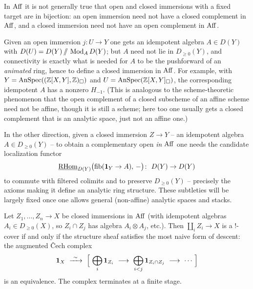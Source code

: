 \begin{remark}
\label{rmk:18:open-vs-closed}
In $\operatorname{Aff}$ it is not generally true that open and closed immersions with a fixed
target are in bijection: an open immersion need not have a closed complement in
$\operatorname{Aff}$, and a closed immersion need not have an open complement in $\operatorname{Aff}$.

Given an open immersion $j\colon U\to Y$ one gets an idempotent algebra $A\in D(Y)$
with $D(U)=D(Y)\,/\!\!/\,\operatorname{Mod}_A D(Y)$; but $A$ need not lie in $D_{\ge0}(Y)$, and
connectivity is exactly what is needed for $A$ to be the pushforward of an
\emph{animated} ring, hence to define a closed immersion in $\operatorname{Aff}$. For example,
with $Y=\operatorname{AnSpec}((\mathbb{Z}[X,Y],\mathbb{Z})_\square)$ and
$U=\operatorname{AnSpec}(\mathbb{Z}[X,Y]_\square)$, the corresponding idempotent $A$ has a nonzero
$H_{-1}$. (This is analogous to the scheme-theoretic phenomenon that the open
complement of a closed subscheme of an affine scheme need not be affine, though it
is still a scheme; here too one usually gets a closed complement that is an
analytic space, just not an affine one.)

In the other direction, given a closed immersion $Z\to Y$ -- an idempotent algebra
$A\in D_{\ge0}(Y)$ -- to obtain a complementary open \emph{in $\operatorname{Aff}$} one needs the
candidate localization functor
\begin{equation*}
\underline{\mathrm{RHom}}_{D(Y)}\bigl(\operatorname{fib}(\mathbf 1_Y\to A),\,-\bigr)\colon\ D(Y)\to D(Y)
\end{equation*}
to commute with filtered colimits and to preserve $D_{\ge0}(Y)$ -- precisely the
axioms making it define an analytic ring structure. These subtleties will be
largely fixed once one allows general (non-affine) analytic spaces and stacks.
\end{remark}

\begin{proposition}
\label{prop:18:closed-cover}
Let $Z_1,\dots,Z_n\to X$ be closed immersions in $\operatorname{Aff}$ (with idempotent algebras
$A_i\in D_{\ge0}(X)$, so $Z_i\cap Z_j$ has algebra $A_i\otimes A_j$, etc.). Then
$\coprod_{i} Z_i\to X$ is a $!$-cover if and only if the structure sheaf satisfies
the most naive form of descent: the augmented \v Cech complex
\begin{equation}
\label{eq:18:closed-cech}
\mathbf 1_X\ \xrightarrow{\ \sim\ }\ \Bigl[\ \bigoplus_i \mathbf 1_{Z_i}\ \longrightarrow\ \bigoplus_{i<j}\mathbf 1_{Z_i\cap Z_j}\ \longrightarrow\ \cdots\ \Bigr]
\end{equation}
is an equivalence. The complex terminates at a finite stage.
\end{proposition}

